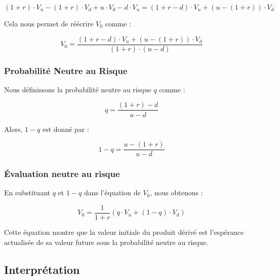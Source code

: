 \documentclass[12pt,a4paper]{article}
\begin{document}
\[(1 + r) \cdot V_u - (1 + r) \cdot V_d + u \cdot V_d - d \cdot V_u = (1 + r - d) \cdot V_u + (u - (1 + r)) \cdot V_d\]

Cela nous permet de réécrire \(V_0\) comme :

\begin{equation}
    V_0 = \frac{(1 + r - d) \cdot V_u + (u - (1 + r)) \cdot V_d}{(1 + r) \cdot (u - d)}
\end{equation}

\subsubsection{Probabilité Neutre au Risque}

Nous définissons la probabilité neutre au risque \(q\) comme :

\begin{equation}
q = \frac{(1 + r) - d}{u - d}
\end{equation}

Alors, \(1 - q\) est donné par :

\begin{equation}
1 - q = \frac{u - (1 + r)}{u - d}
\end{equation}

\subsubsection{Évaluation neutre au risque}

En substituant \(q\) et \(1 - q\) dans l'équation de \(V_0\), nous obtenons :

\begin{equation}
\boxed{V_0 = \frac{1}{1 + r} \left( q \cdot V_u + (1 - q) \cdot V_d \right)}
\end{equation}

Cette équation montre que la valeur initiale du produit dérivé est l'espérance actualisée de sa valeur future sous la probabilité neutre au risque.
\begin{flushright}
\end{flushright}

\subsection{Interprétation}
\end{document}
